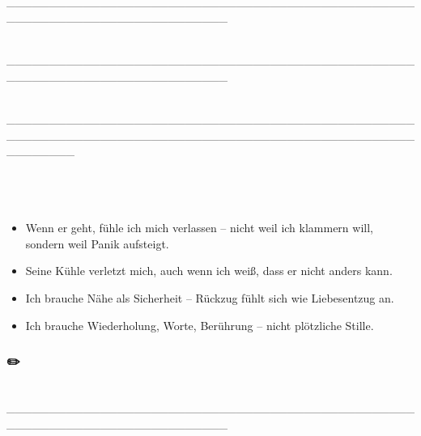 📝 \_\_\_\_\_\_\_\_\_\_\_\_\_\_\_\_\_\_\_\_\_\_\_\_\_\_\_\_\_\_\_\_\_\_\_\_\_\_\_\_\_\_\_\_\_\_\_\_\_\_\_\_\_\_\_\_\_\_\_\_\_\_\_\_\_\_\_\_\_\_\_\_\_\_

📝 \_\_\_\_\_\_\_\_\_\_\_\_\_\_\_\_\_\_\_\_\_\_\_\_\_\_\_\_\_\_\_\_\_\_\_\_\_\_\_\_\_\_\_\_\_\_\_\_\_\_\_\_\_\_\_\_\_\_\_\_\_\_\_\_\_\_\_\_\_\_\_\_\_\_

📝 \_\_\_\_\_\_\_\_\_\_\_\_\_\_\_\_\_\_\_\_\_\_\_\_\_\_\_\_\_\_\_\_\_\_\_\_\_\_\_\_\_\_\_\_\_\_\_\_\_\_\_\_\_\_\_\_\_\_\_\_\_\_\_\_\_\_\_\_\_\_\_\_\_\_\_\_\_\_\_\_\_\_\_\_\_\_\_\_\_\_\_\_\_\_\_\_\_\_\_\_\_\_\_\_

\hfill\break
\hfill\break

\hfill\break
\hfill\break

\hypertarget{wie-sie-die-dynamik-erlebt}{%
\subsection[🧩 \ul{\textbf{\textcolor{ctmmBlue}{\1}}} \ul{\textbf{\textcolor{ctmmBlue}{\1}}} \ul{\textbf{\textcolor{ctmmBlue}{\1}}}]{\texorpdfstring{\protect\hypertarget{wie-sie-die-dynamik-erlebt}{}{}🧩 \ul{\textbf{\textcolor{ctmmBlue}{\1}}} \ul{\textbf{\textcolor{ctmmBlue}{\1}}} \ul{\textbf{\textcolor{ctmmBlue}{\1}}}}{🧩 WIE SIE DIE DYNAMIK ERLEBT}}\label{wie-sie-die-dynamik-erlebt}}

\begin{itemize}[label=\textcolor{ctmmOrange}{\faArrowRight}]
\item
  Wenn er geht, fühle ich mich verlassen -- nicht weil ich klammern will, sondern weil Panik aufsteigt.
\item
  Seine Kühle verletzt mich, auch wenn ich weiß, dass er nicht anders kann.
\item
  Ich brauche Nähe als Sicherheit -- Rückzug fühlt sich wie Liebesentzug an.
\item
  Ich brauche Wiederholung, Worte, Berührung -- nicht plötzliche Stille.
\end{itemize}

\hypertarget{eigene-worte-1}{%
\subsubsection[✏️ \ul{\textbf{\textcolor{ctmmBlue}{\1}}}]{\texorpdfstring{\protect\hypertarget{eigene-worte-1}{}{}✏️ \ul{\textbf{\textcolor{ctmmBlue}{\1}}}}{✏️ Eigene Worte:}}\label{eigene-worte-1}}

📝 \_\_\_\_\_\_\_\_\_\_\_\_\_\_\_\_\_\_\_\_\_\_\_\_\_\_\_\_\_\_\_\_\_\_\_\_\_\_\_\_\_\_\_\_\_\_\_\_\_\_\_\_\_\_\_\_\_\_\_\_\_\_\_\_\_\_\_\_\_\_\_\_\_\_

